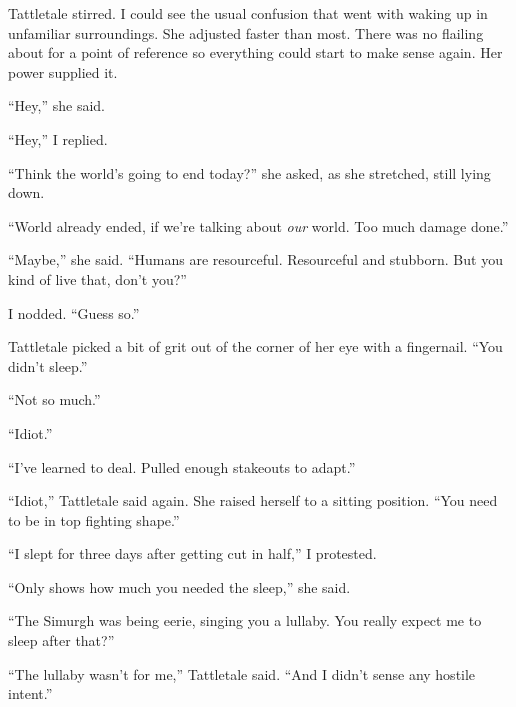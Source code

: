 





Tattletale stirred.  I could see the usual confusion that went with waking up in unfamiliar surroundings.  She adjusted faster than most.  There was no flailing about for a point of reference so everything could start to make sense again.  Her power supplied it.



``Hey,'' she said.



``Hey,'' I replied.



``Think the world's going to end today?''  she asked, as she stretched, still lying down.



``World already ended, if we're talking about \emph{our} world.  Too much damage done.''



``Maybe,'' she said.  ``Humans are resourceful.  Resourceful and stubborn.  But you kind of live that, don't you?''



I nodded.  ``Guess so.''



Tattletale picked a bit of grit out of the corner of her eye with a fingernail.  ``You didn't sleep.''



``Not so much.''



``Idiot.''



``I've learned to deal.  Pulled enough stakeouts to adapt.''



``Idiot,'' Tattletale said again.  She raised herself to a sitting position.  ``You need to be in top fighting shape.''



``I slept for three days after getting cut in half,'' I protested.



``Only shows how much you needed the sleep,'' she said.



``The Simurgh was being eerie, singing you a lullaby.  You really expect me to sleep after that?''



``The lullaby wasn't for me,'' Tattletale said.  ``And I didn't sense any hostile intent.''



